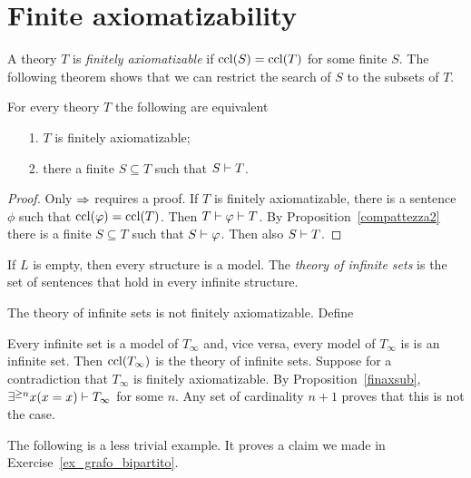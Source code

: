 \documentclass[creche.tex]{subfiles}
\begin{document}
\section{Finite axiomatizability}

A theory $T$ is \emph{finitely axiomatizable\/} if ${\rm ccl}(S)={\rm ccl}(T)$ for some finite $S$. The following theorem shows that we can restrict the search of $S$ to the subsets of $T$.

\begin{proposition}\label{finaxsub} For every theory $T$ the following are equivalent
\begin{itemize}
\item[1.] $T$ is finitely axiomatizable;
\item[2.] there a finite $S\subseteq T$ such that $S\vdash T$.
\end{itemize}
\end{proposition}

\begin{proof}
Only $\Rightarrow$ requires a proof. If $T$ is finitely axiomatizable, there is a sentence $\phi$ such that ${\rm ccl}(\varphi)={\rm ccl}(T)$. Then $T\vdash\varphi\vdash T$. By Proposition~\ref{compattezza2} there is a finite $S\subseteq T$ such that $S\vdash\varphi$. Then also $S\vdash T$.
\end{proof}

If $L$ is empty, then every structure is a model. The \emph{theory of infinite sets\/} is the set of sentences that hold in every infinite structure.

\begin{example} 
The theory of infinite sets is not finitely axiomatizable. Define


Every infinite set is a model of $T_{\infty}$ and, vice versa, every model of $T_{\infty}$ is is an infinite set. Then ${\rm ccl}(T_{\infty})$ is the theory of infinite sets. Suppose for a contradiction that $T_{\infty}$ is finitely axiomatizable. By Proposition~\ref{finaxsub}, $\exists^{\ge n}x (x=x)\vdash T_{\infty}$ for some $n$. Any set of cardinality $n+1$ proves that this is not the case.\QED
\end{example}

The following is a less trivial example. It proves a claim we made in Exercise~\ref{ex_grafo_bipartito}.
\end{document}
